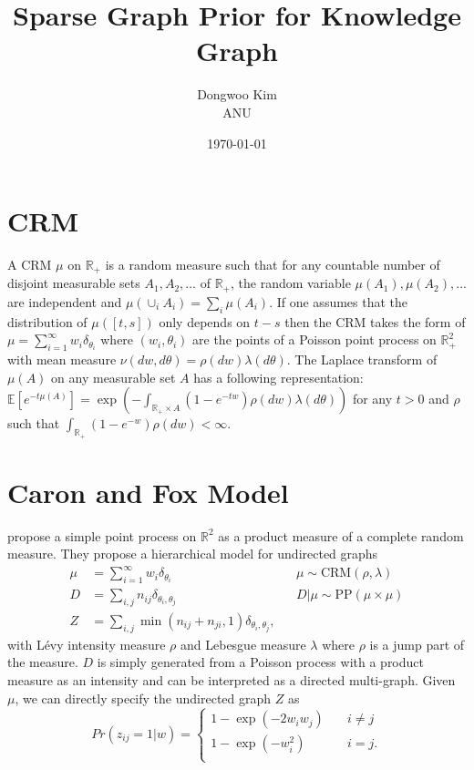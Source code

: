 \documentclass{article}
\title{Sparse Graph Prior for Knowledge Graph}
\date{\today}
\author{Dongwoo Kim\\ANU}
\begin{document}
\maketitle

\section{CRM}
A CRM $\mu$ on $\mathbb{R}_+$ is a random measure such that for any countable number of disjoint measurable sets $A_1, A_2, ...$ of $\mathbb{R}_+$, the random variable $\mu(A_1), \mu(A_2), ...$ are independent and $\mu(\cup_i A_i) = \sum_i \mu(A_i)$. If one assumes that the distribution of $\mu([t,s])$ only depends on $t-s$ then the CRM takes the form of $\mu = \sum_{i=1}^{\infty}w_i\delta_{\theta_i}$ where $(w_i, \theta_i)$ are the points of a Poisson point process on $\mathbb{R}_+^2$ with mean measure $\nu(dw, d\theta) = \rho(dw)\lambda(d\theta)$. The Laplace transform of $\mu(A)$ on any measurable set $A$ has a following representation: $\mathbb{E}[e^{-t\mu(A)}] = \exp(-\int_{\mathbb{R}_+ \times A}(1-e^{-tw})\rho(dw)\lambda(d\theta))$ for any $t>0$ and $\rho$ such that $\int_{\mathbb{R}_+}(1-e^{-w})\rho(dw) < \infty$.

\section{Caron and Fox Model}

\cite{Caron2015} propose a simple point process on $\mathbb{R}^2$ as a product measure of a complete random measure. They propose a hierarchical model for undirected graphs
\begin{align}
\mu &= \sum_{i=1}^{\infty} w_i \delta_{\theta_i} & &\mu \sim \text{CRM}(\rho, \lambda)\\
D &= \sum_{i,j} n_{ij} \delta_{\theta_i, \theta_j} & &D|\mu \sim \text{PP}(\mu \times \mu)\\
Z &=\sum_{i,j} \min(n_{ij} + n_{ji}, 1)\delta_{\theta_i, \theta_j}, \label{eqn:cnf}&&
\end{align}
with L\'{e}vy intensity measure $\rho$ and Lebesgue measure $\lambda$ where $\rho$ is a jump part of the measure. $D$ is simply generated from a Poisson process with a product measure as an intensity and can be interpreted as a directed multi-graph.
Given $\mu$, we can directly specify the undirected graph $Z$ as
\[ Pr(z_{ij}=1|w) = 
  \begin{cases}
    1 - \exp(-2w_iw_j)       & \quad i \neq j\\
    1 - \exp(-w_i^2) & \quad i = j.\\
  \end{cases}
\]
\end{document}

